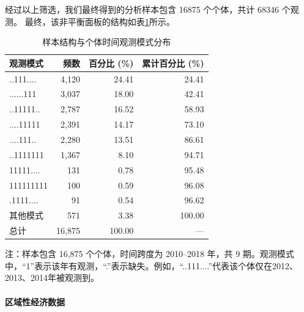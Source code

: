 \documentclass[
  a4paper,
  zihao=-4,
  fontset=mac,
  AutoFakeBold,
  AutoFakeSlant,
  oneside]{ctexbook}
\begin{document}
经过以上筛选，我们最终得到的分析样本包含 16875 个个体，共计 68346 个观测。
最终，该非平衡面板的结构如表\ref{tab:sample_structure}所示。
\begin{table}[!ht]
\centering
\caption{样本结构与个体时间观测模式分布}
\label{tab:sample_structure}
\begin{tabular}{lrrr}
\toprule
观测模式 & 频数 & 百分比 (\%) & 累计百分比 (\%) \\
\midrule
..111....   & 4,120 & 24.41 & 24.41 \\
......111   & 3,037 & 18.00 & 42.41 \\
..11111..   & 2,787 & 16.52 & 58.93 \\
....11111   & 2,391 & 14.17 & 73.10 \\
....111..   & 2,280 & 13.51 & 86.61 \\
..1111111   & 1,367 &  8.10 & 94.71 \\
11111....   &   131 &  0.78 & 95.48 \\
111111111   &   100 &  0.59 & 96.08 \\
.1111....   &    91 &  0.54 & 96.62 \\
其他模式     &   571 &  3.38 & 100.00 \\
\midrule
总计        & 16,875 & 100.00 & — \\
\bottomrule
\end{tabular}

\vspace{1em}
\begin{minipage}{\linewidth}
\small
注：样本包含 16,875 个个体，时间跨度为 2010–2018 年，共 9 期。观测模式中，“1”表示该年有观测，“.”表示缺失。例如，“..111....”代表该个体仅在2012、2013、2014年被观测到。
\end{minipage}
\end{table}


\paragraph{区域性经济数据}
\end{document}
